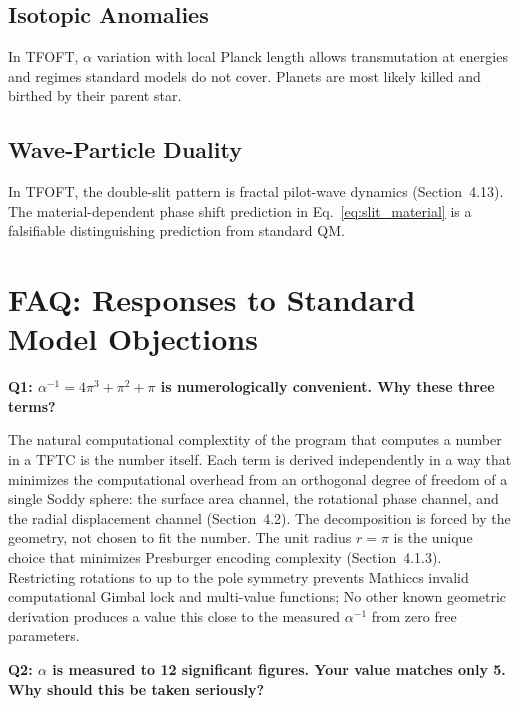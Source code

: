 \documentclass[11pt,a4paper]{article}
\begin{document}
\subsection{Isotopic Anomalies}
In TFOFT, $\alpha$ variation with local Planck length allows transmutation at energies
and regimes standard models do not cover. Planets are most likely killed and birthed
by their parent star.

\subsection{Wave-Particle Duality}
In TFOFT, the double-slit pattern is fractal pilot-wave dynamics (Section~4.13).
The material-dependent phase shift prediction in Eq.~\eqref{eq:slit_material} is a
falsifiable distinguishing prediction from standard QM.


\section{FAQ: Responses to Standard Model Objections}

\begin{mdframed}
\textbf{Q1: $\alpha^{-1} = 4\pi^3 + \pi^2 + \pi$ is numerologically convenient.
Why these three terms?}
\end{mdframed}

The natural computational complextity of the program that computes a number in a TFTC is the number itself. Each term is derived independently in a way that minimizes the computational overhead from an orthogonal degree of freedom of a single
Soddy sphere: the surface area channel, the rotational phase channel, and the radial displacement channel (Section~4.2). The decomposition is forced by the geometry, not chosen to fit the number. The unit radius $r = \pi$ is the unique choice that
minimizes Presburger encoding complexity (Section~4.1.3). Restricting rotations to up to the pole symmetry prevents Mathiccs invalid computational Gimbal lock and multi-value functions; No other known geometric derivation produces a value this close to the measured $\alpha^{-1}$ from zero free parameters.

\begin{mdframed}
\textbf{Q2: $\alpha$ is measured to 12 significant figures. Your value matches only 5.
Why should this be taken seriously?}
\end{mdframed}
\end{document}
